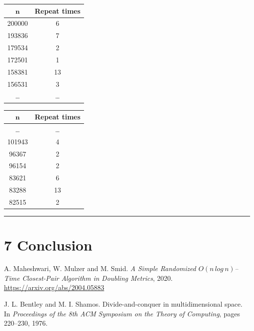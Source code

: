 \documentclass[12pt,english,]{article}
\let\origfigure\figure
\let\endorigfigure\endfigure
\renewenvironment{figure}[1][2] {
    \expandafter\origfigure\expandafter[H]
} {
    \endorigfigure
}
\begin{document}
\begin{figure}
\begin{minipage}{0.48\textwidth}
  \centering
  \begin{tabular}{|c|c|}
  \hline
  $\pmb n$   & \textbf{Repeat times} \\ \hline
   200000  & 6            \\ \hline
   193836  & 7            \\ \hline
   179534  & 2            \\ \hline
   172501  & 1            \\ \hline
   158381  & 13           \\ \hline
   156531  & 3            \\ \hline
  \ldots   & \ldots       \\ \hline
  \end{tabular}
\end{minipage}
\begin{minipage}{0.48\textwidth}
  \centering
  \begin{tabular}{|c|c|}
  \hline
  $\pmb n$   & \textbf{Repeat times} \\ \hline
  \ldots   & \ldots       \\ \hline
  101943   & 4            \\ \hline
   96367   & 2            \\ \hline
   96154   & 2            \\ \hline
   83621   & 6            \\ \hline
   83288   & 13           \\ \hline
   82515   & 2            \\ \hline
  \end{tabular}
\end{minipage}
\caption[Caption]{Given an input of $200\,000$ points generated in a grid. This is a portion of the data about the number of times the algorithm \textsc{SepAnn$(S,n,d,\mu,c)$} repeats.}
\label{fig:data}

\end{figure}

\hrule

\hypertarget{section6}{%
\section{\texorpdfstring{7
\enspace Conclusion}{7 Conclusion}}\label{section6}}

\medskip

\begin{thebibliography}{9}
A. Maheshwari, W. Mulzer and M. Smid. \emph{A Simple Randomized $O(n\,log\,n)$–Time Closest-Pair Algorithm in Doubling Metrics}, 2020. \url{https://arxiv.org/abs/2004.05883}

J. L. Bentley and M. I. Shamos. Divide-and-conquer in multidimensional space. In \emph{Proceedings of the 8th ACM Symposium on the Theory of Computing}, pages 220–230,
1976.

\end{thebibliography}
\end{document}
